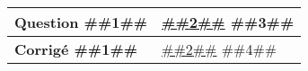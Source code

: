 \documentclass[a4paper,11pt]{article}
\begin{document}
\begin{longtable}{|p{3cm}|p{15cm}|}
 

\hline 
\textbf{Question ##{{1}}##} & \underline{##{{2}}##} \newline ##{{3}}## \\



\hline 
\textbf{Corrigé ##{{1}}##} & \underline{##{{2}}##} \newline ##{{4}}##  \\


 
\hline 
\end{longtable} 
\end{document}
